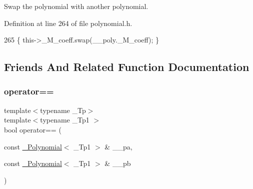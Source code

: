 Swap the polynomial with another polynomial. 

Definition at line 264 of file polynomial.\+h.


\begin{DoxyCode}
265       \{ this->\_M\_coeff.swap(\_\_poly.\_M\_coeff); \}
\end{DoxyCode}


\subsection{Friends And Related Function Documentation}
\mbox{\label{class____gnu__cxx_1_1__Polynomial_abb21e2bfe0dc97a44ae9eeffb6f930aa}} 
\subsubsection{\texorpdfstring{operator==}{operator==}}
{\footnotesize\ttfamily template$<$typename \+\_\+\+Tp$>$ \\
template$<$typename \+\_\+\+Tp1 $>$ \\
bool operator== (\begin{DoxyParamCaption}\item[{const \hyperlink{class____gnu__cxx_1_1__Polynomial}{\+\_\+\+Polynomial}$<$ \+\_\+\+Tp1 $>$ \&}]{\+\_\+\+\_\+pa,  }\item[{const \hyperlink{class____gnu__cxx_1_1__Polynomial}{\+\_\+\+Polynomial}$<$ \+\_\+\+Tp1 $>$ \&}]{\+\_\+\+\_\+pb }\end{DoxyParamCaption})\hspace{0.3cm}{\ttfamily [friend]}}

\mbox{\label{class____gnu__cxx_1_1__Polynomial_a929d1753cc00510f102f61a2bbeb0d2d}} 
